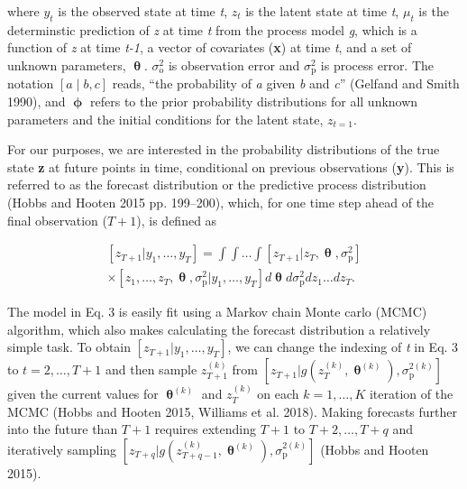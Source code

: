 \documentclass[12pt,]{article}
\begin{document}
\noindent{}where \(y_t\) is the observed state at time \emph{t}, \(z_t\)
is the latent state at time \emph{t}, \(\mu_t\) is the determinstic
prediction of \emph{z} at time \emph{t} from the process model \emph{g},
which is a function of \emph{z} at time \emph{t-1}, a vector of
covariates (\textbf{x}) at time \emph{t}, and a set of unknown
parameters, \(\bm{\uptheta}\). \(\sigma^2_{\text{o}}\) is observation
error and \(\sigma^2_{\text{p}}\) is process error. The notation
\(\left[a \;|\; b, c\right]\) reads, ``the probability of \emph{a} given
\emph{b} and \emph{c}'' (Gelfand and Smith 1990), and \(\bm{\upphi}\)
refers to the prior probability distributions for all unknown parameters
and the initial conditions for the latent state, \(z_{t=1}\).

For our purposes, we are interested in the probability distributions of
the true state \textbf{z} at future points in time, conditional on
previous observations (\textbf{y}). This is referred to as the forecast
distribution or the predictive process distribution (Hobbs and Hooten
2015 pp. 199--200), which, for one time step ahead of the final
observation (\(T+1\)), is defined as

\begin{equation}
\begin{gathered}
\left[z_{T+1} | y_1,\dots,y_T \right] = \int \int \dots \int \left[z_{T+1} | z_T,\bm{\uptheta}, \sigma^2_{\text{p}} \right] \\ \times \left[z_1,\dots,z_T,\bm{\uptheta}, \sigma^2_{\text{p}} | y_1,\dots,y_T \right] d\bm{\uptheta} d\sigma^2_{\text{p}} dz_1 \dots dz_T.
\end{gathered}
\end{equation}

The model in Eq. 3 is easily fit using a Markov chain Monte carlo (MCMC)
algorithm, which also makes calculating the forecast distribution a
relatively simple task. To obtain
\(\left[z_{T+1} | y_1,\dots,y_T \right]\), we can change the indexing of
\emph{t} in Eq. 3 to \(t = 2,\dots,T+1\) and then sample
\(z_{T+1}^{(k)}\) from
\(\left[z_{T+1} | g(z_T^{(k)},\bm{\uptheta}^{(k)}), \sigma^{2(k)}_{\text{p}} \right]\)
given the current values for \(\bm{\uptheta}^{(k)}\) and \(z_{T}^{(k)}\)
on each \(k = 1,\dots,K\) iteration of the MCMC (Hobbs and Hooten 2015,
Williams et al. 2018). Making forecasts further into the future than
\(T+1\) requires extending \(T+1\) to \(T+2,\dots,T+q\) and iteratively
sampling
\(\left[z_{T+q} | g(z_{T+q-1}^{(k)},\bm{\uptheta}^{(k)}), \sigma^{2(k)}_{\text{p}} \right]\)
(Hobbs and Hooten 2015).
\end{document}
